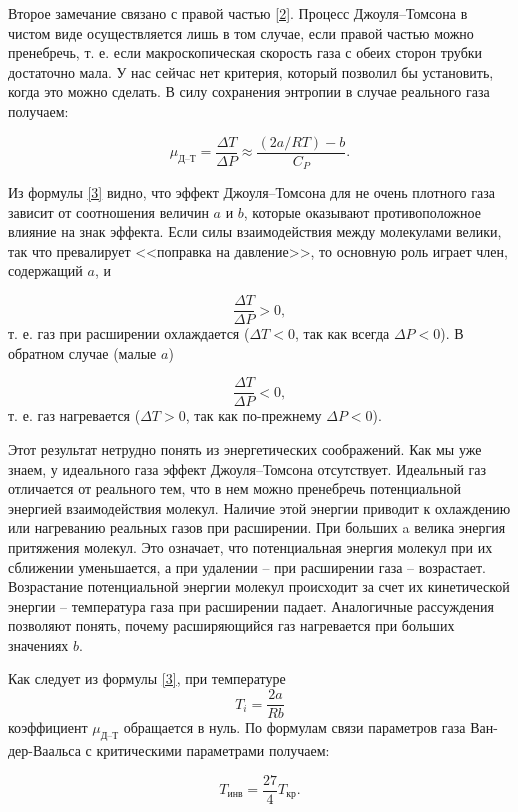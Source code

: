 \documentclass[12pt,a4paper]{article}
\begin{document}
Второе замечание связано с правой частью \eqref{2}. Процесс Джоуля–Томсона в чистом виде осуществляется лишь в том случае, если правой частью можно пренебречь, т. е. если макроскопическая скорость газа с обеих сторон трубки достаточно мала. У нас сейчас нет критерия, который позволил бы установить, когда это можно сделать. В силу сохранения энтропии в случае реального газа получаем:

\begin{equation}\label{3}
\mu_\text{Д--Т} = \frac{\Delta T}{\Delta P} \approx \frac{(2a/RT) - b}{C_P}.
\end{equation}

Из формулы \eqref{3} видно, что эффект Джоуля–Томсона для не очень плотного газа зависит от соотношения величин $ a $ и $ b $, которые оказывают противоположное влияние на знак эффекта. Если силы взаимодействия между молекулами велики, так что превалирует <<поправка на давление>>, то основную роль играет член, содержащий $ a $, и 

\[ \frac{\Delta T}{\Delta P} > 0, \]
т. е. газ при расширении охлаждается ($ \Delta T < 0 $, так как всегда $ \Delta P < 0 $). В обратном случае (малые $ a $)

\[ \frac{\Delta T}{\Delta P} < 0, \]
т. е. газ нагревается ($ \Delta T > 0 $, так как по-прежнему $ \Delta P < 0 $).

Этот результат нетрудно понять из энергетических соображений. Как мы уже знаем, у идеального газа эффект Джоуля–Томсона отсутствует. Идеальный газ отличается от реального тем, что в нем можно пренебречь потенциальной энергией взаимодействия молекул. Наличие этой энергии приводит к охлаждению или нагреванию реальных газов при расширении. При больших a велика энергия притяжения молекул. Это означает, что потенциальная энергия молекул при их сближении уменьшается, а при удалении -- при расширении газа -- возрастает. Возрастание потенциальной энергии молекул происходит за счет их кинетической энергии -- температура газа при расширении падает. Аналогичные рассуждения позволяют понять, почему расширяющийся газ нагревается при больших значениях $ b $.

Как следует из формулы \eqref{3}, при температуре \[ T_i = \frac{2a}{Rb} \] коэффициент $ \mu_\text{Д--Т} $ обращается в нуль. По формулам связи параметров газа Ван-дер-Ваальса с критическими параметрами получаем: 

\begin{equation}\label{4}
T_\text{инв} = \frac{27}{4} T_\text{кр}.
\end{equation}
\end{document}
